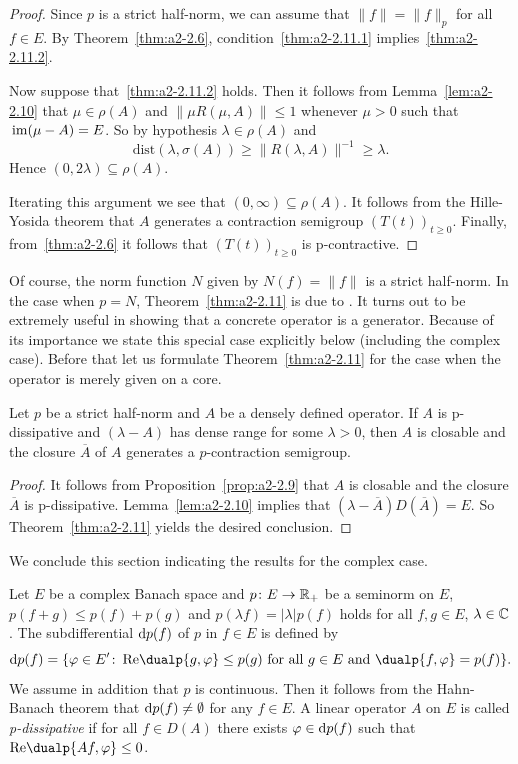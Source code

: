 \begin{proof}
Since $p$ is a strict half-norm, we can assume that $\|f\| = \|f\|_{p}$ for all $f \in E$.
By Theorem~\ref{thm:a2-2.6}, condition~\ref{thm:a2-2.11.1} implies~\ref{thm:a2-2.11.2}. 

Now suppose that~\ref{thm:a2-2.11.2}  holds.
Then it follows from Lemma~\ref{lem:a2-2.10}   
that $\mu \in \rho(A)$ and $\|\mu R(\mu,A)\| \leq 1$ whenever $\mu > 0$ such that $\mathop{}\mathrm{im}(\mu-A) = E$.
So by hypothesis $\lambda \in \rho(A)$ and 
%
\[
	\mathrm{dist}(\lambda,\sigma(A)) \geq \|R(\lambda,A)\|^{-1} \geq \lambda .
\]
%
Hence $(0,2\lambda) \subseteq \rho(A)$.

Iterating this argument we see that $(0,\infty) \subseteq \rho(A)$.
It follows from the Hille-Yosida theorem that $A$ generates a contraction semigroup $(T(t))_{t\geq 0}$.
Finally, from~\ref{thm:a2-2.6} it follows that $(T(t))_{t\geq 0}$ is p-contractive.
\end{proof}
Of course, the norm function $N$ given by $N(f) = \|f\|$ is a strict half-norm.
In the case when $p = N$, Theorem~\ref{thm:a2-2.11}    
is due to \textcite{lumerphillips:1961}.
It turns out to be extremely useful in showing that a concrete operator is a generator.
Because of its importance we state this special case explicitly below (including the complex case).
Before that let us formulate Theorem~\ref{thm:a2-2.11}   
for the case when the operator is merely given on a core.
\begin{corollary}\label{cor:a2-2.12}
Let $p$ be a strict half-norm and $A$ be a densely defined operator.
If\/ $A$ is p-dissipative and $(\lambda - A)$ has dense range for some $\lambda > 0$, then $A$ is closable and the closure $\overline{A}$ of\/ $A$ generates a $p$-contraction semigroup.
\end{corollary}
\begin{proof}
It follows from Proposition~\ref{prop:a2-2.9} that $A$ is closable and the closure $\overline{A}$ is p-dissipative.
Lemma~\ref{lem:a2-2.10} implies that $(\lambda- \overline{A})D(\overline{A}) = E$.
So Theorem~\ref{thm:a2-2.11} yields the desired conclusion.
\end{proof}
We conclude this section indicating the results for the complex case.

Let $E$ be a complex Banach space and $p \colon E \to \mathbb{R}_{+}$ 
be a seminorm on $E$, \ie $p(f + g) \leq p(f) + p(g)$ and $p(\lambda f) = |\lambda|p(f)$ holds for all $f, g \in E$, $\lambda \in \mathbb{C}$.
The subdifferential $\mathop{}\!\mathrm{d}{p}(f)$ of\/ $p$ in $f \in E$ is defined by
\begin{equation}\label{eq:a2-4.15}
\ddp(f) = \{\phi \in E' \colon \Re\dualp{g,\phi} \leq p(g) \text{ for all } g \in E \text{ and } \dualp{f,\phi} = p(f)\}.
\end{equation}
We assume in addition that $p$ is continuous.
Then it follows from the Hahn-Banach theorem that $\mathop{}\!\mathrm{d}{p}(f) \neq \emptyset$ for any $f \in E$.
A linear operator $A$ on $E$ is called \emph{p-dissipative} if for all $f \in D(A)$ there exists $\phi \in \ddp(f)$ such that $\Re\dualp{Af,\phi} \leq 0$.

